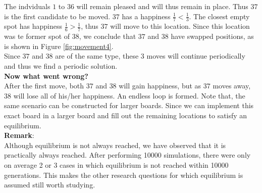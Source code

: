 The indviduals \(1\) to \(36\) will remain pleased and will thus remain in place. 
Thus $37$ is the first candidate to be moved. $37$ has a happiness $\frac{1}{7} < \frac{1}{3}$. 
The closest empty spot has happiness $\frac{1}{6} > \frac{1}{7}$, thus $37$ will move to this location. 
Since this location was te former spot of \(38\), we conclude that  $37$ and $38$ have swapped positions, as is shown in Figure \ref{fig:movement4}.\\
Since $37$ and $38$ are of the same type, these $3$ moves will continue periodically and thus we find a periodic solution.\\

\textbf{Now what went wrong?} \\
After the first move, both $37$ and $38$ will gain happiness, but as \(37\) moves away, $38$ will lose all of his/her happiness. 
An endless loop is formed.
Note that, the same scenario can be constructed for larger boards. 
Since we can implement this exact board in a larger board and fill out the remaining locations to satisfy an equilibrium.\\

\textbf{Remark}:\\
 Although equilibrium is not always reached, we have observed that it is practically always reached. After performing 10000 simulations, there were only on average 2 or 3 cases in which equilibrium is not reached within 10000 generations. This makes the other research questions for which equilibrium is assumed still worth studying.
